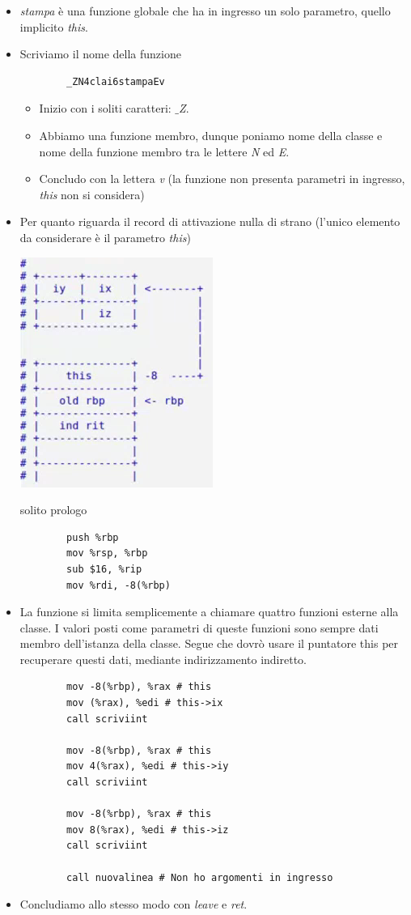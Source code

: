 \begin{itemize}
	\item \emph{stampa} è una funzione globale che ha in ingresso un solo parametro, quello implicito \emph{this}.
	\item Scriviamo il nome della funzione
	\begin{verbatim}
		_ZN4clai6stampaEv
	\end{verbatim}
	\begin{itemize}
		\item Inizio con i soliti caratteri: \emph{$\_$Z}.
		\item Abbiamo una funzione membro, dunque poniamo nome della classe e nome della funzione membro tra le lettere \emph{N} ed \emph{E}.
		\item Concludo con la lettera \emph{v} (la funzione non presenta parametri in ingresso, \emph{this} non si considera)
	\end{itemize}
	\item Per quanto riguarda il record di attivazione nulla di strano (l'unico elemento da considerare è il parametro \emph{this})
	\begin{center}
		\includegraphics{img/39.PNG}
	\end{center}  
	solito prologo
	\begin{verbatim}
		push %rbp
		mov %rsp, %rbp
		sub $16, %rip
		mov %rdi, -8(%rbp)
	\end{verbatim}
	\item La funzione si limita semplicemente a chiamare quattro funzioni esterne alla classe. I valori posti come parametri di queste funzioni sono sempre dati membro dell'istanza della classe. Segue che dovrò usare il puntatore this per recuperare questi dati, mediante indirizzamento indiretto. 
	\begin{verbatim}
		mov -8(%rbp), %rax # this
		mov (%rax), %edi # this->ix
		call scriviint
		
		mov -8(%rbp), %rax # this
		mov 4(%rax), %edi # this->iy
		call scriviint
		
		mov -8(%rbp), %rax # this
		mov 8(%rax), %edi # this->iz
		call scriviint
		
		call nuovalinea # Non ho argomenti in ingresso
	\end{verbatim}
	\item Concludiamo allo stesso modo con \emph{leave} e \emph{ret}.
\end{itemize}
